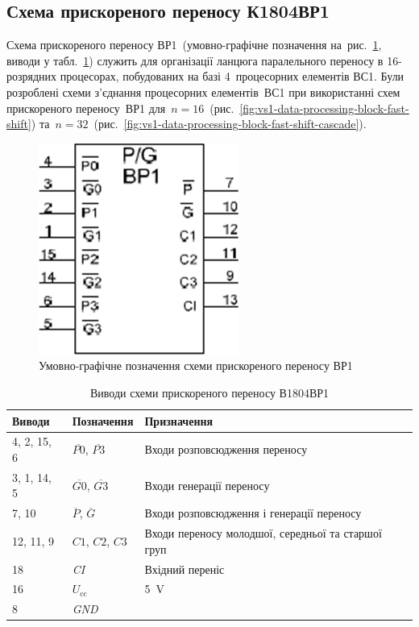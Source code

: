 \documentclass[a4paper,oneside,DIV=12,12pt,headings=normal]{scrartcl}
\newcommand{\schel}[1]{\textit{#1}}
\begin{document}
			\subsection{Схема прискореного переносу К1804ВР1}
				Схема прискореного переносу ВР1~(умовно-графічне позначення на~рис.~\ref{fig:vs1-fast-shift}, виводи у табл.~\ref{tab:vs1-fast-shift-outs}) служить для організації ланцюга паралельного переносу в 16-розрядних процесорах, побудованих на базі 4~процесорних елементів ВС1. Були розроблені схеми з'єднання процесорних елементів~ВС1 при використанні схем прискореного переносу~ВР1 для~$n = 16$~(рис.~\ref{fig:vs1-data-processing-block-fast-shift}) та~$n = 32$~(рис.~\ref{fig:vs1-data-processing-block-fast-shift-cascade}).
				\begin{figure}[!htbp]
					\centering
					\includegraphics[height = 7\baselineskip]{./assets/04-vs1-fast-shift.png}
					\caption{Умовно-графічне позначення схеми прискореного переносу ВР1}
					\label{fig:vs1-fast-shift}
				\end{figure}

				\begin{table}[!htbp]
					\centering
					\begin{tabular}{lll}
						\toprule
							Виводи & Позначення & Призначення \\
						\midrule
							4, 2, 15, 6 & $\overline{P0}$, $\overline{P3}$ & Входи розповсюдження переносу \\
							3, 1, 14, 5 & $\overline{G0}$, $\overline{G3}$ & Входи генерації переносу \\
							7, 10       & $\overline{P}$, $\overline{G}$   & Входи розповсюдження і генерації переносу \\
							12, 11, 9   & $C1$, $C2$, $C3$                 & Входи переносу молодшої, середньої та старшої груп\\
							18          & \schel{CI}                       & Вхідний переніс \\
							16          & $U_{\mathrm{cc}}$                & \SI{5}{\volt} \\
							8           & \schel{GND}                      & \\
						\bottomrule
					\end{tabular}
					\caption{Виводи схеми прискореного переносу В1804ВР1}
					\label{tab:vs1-fast-shift-outs}
				\end{table}
\end{document}

